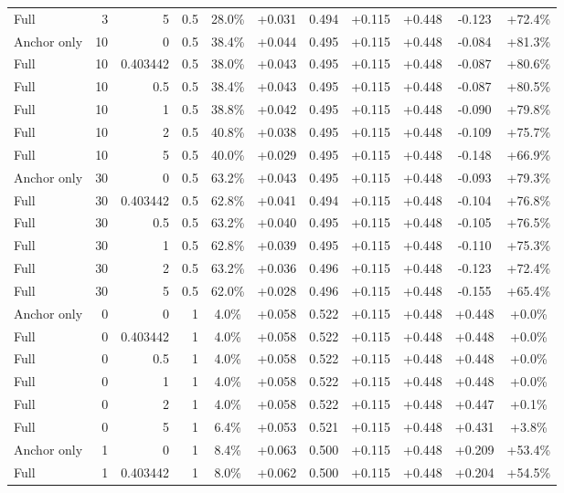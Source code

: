 \begin{table}[htbp]
\begin{tabular}{lrrrccccccc}
Full & 3 & 5 & 0.5 & 28.0\% & +0.031 & 0.494 & +0.115 & +0.448 & -0.123 & +72.4\% \\
Anchor only & 10 & 0 & 0.5 & 38.4\% & +0.044 & 0.495 & +0.115 & +0.448 & -0.084 & +81.3\% \\
Full & 10 & 0.403442 & 0.5 & 38.0\% & +0.043 & 0.495 & +0.115 & +0.448 & -0.087 & +80.6\% \\
Full & 10 & 0.5 & 0.5 & 38.4\% & +0.043 & 0.495 & +0.115 & +0.448 & -0.087 & +80.5\% \\
Full & 10 & 1 & 0.5 & 38.8\% & +0.042 & 0.495 & +0.115 & +0.448 & -0.090 & +79.8\% \\
Full & 10 & 2 & 0.5 & 40.8\% & +0.038 & 0.495 & +0.115 & +0.448 & -0.109 & +75.7\% \\
Full & 10 & 5 & 0.5 & 40.0\% & +0.029 & 0.495 & +0.115 & +0.448 & -0.148 & +66.9\% \\
Anchor only & 30 & 0 & 0.5 & 63.2\% & +0.043 & 0.495 & +0.115 & +0.448 & -0.093 & +79.3\% \\
Full & 30 & 0.403442 & 0.5 & 62.8\% & +0.041 & 0.494 & +0.115 & +0.448 & -0.104 & +76.8\% \\
Full & 30 & 0.5 & 0.5 & 63.2\% & +0.040 & 0.495 & +0.115 & +0.448 & -0.105 & +76.5\% \\
Full & 30 & 1 & 0.5 & 62.8\% & +0.039 & 0.495 & +0.115 & +0.448 & -0.110 & +75.3\% \\
Full & 30 & 2 & 0.5 & 63.2\% & +0.036 & 0.496 & +0.115 & +0.448 & -0.123 & +72.4\% \\
Full & 30 & 5 & 0.5 & 62.0\% & +0.028 & 0.496 & +0.115 & +0.448 & -0.155 & +65.4\% \\
Anchor only & 0 & 0 & 1 & 4.0\% & +0.058 & 0.522 & +0.115 & +0.448 & +0.448 & +0.0\% \\
Full & 0 & 0.403442 & 1 & 4.0\% & +0.058 & 0.522 & +0.115 & +0.448 & +0.448 & +0.0\% \\
Full & 0 & 0.5 & 1 & 4.0\% & +0.058 & 0.522 & +0.115 & +0.448 & +0.448 & +0.0\% \\
Full & 0 & 1 & 1 & 4.0\% & +0.058 & 0.522 & +0.115 & +0.448 & +0.448 & +0.0\% \\
Full & 0 & 2 & 1 & 4.0\% & +0.058 & 0.522 & +0.115 & +0.448 & +0.447 & +0.1\% \\
Full & 0 & 5 & 1 & 6.4\% & +0.053 & 0.521 & +0.115 & +0.448 & +0.431 & +3.8\% \\
Anchor only & 1 & 0 & 1 & 8.4\% & +0.063 & 0.500 & +0.115 & +0.448 & +0.209 & +53.4\% \\
Full & 1 & 0.403442 & 1 & 8.0\% & +0.062 & 0.500 & +0.115 & +0.448 & +0.204 & +54.5\% \\

\end{tabular}
\end{table}

